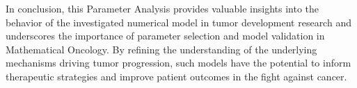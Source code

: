 In conclusion, this Parameter Analysis provides valuable insights into the behavior of the investigated numerical model in tumor development research and underscores the importance of parameter selection and model validation in Mathematical Oncology. By refining the understanding of the underlying mechanisms driving tumor progression, such models have the potential to inform therapeutic strategies and improve patient outcomes in the fight against cancer.